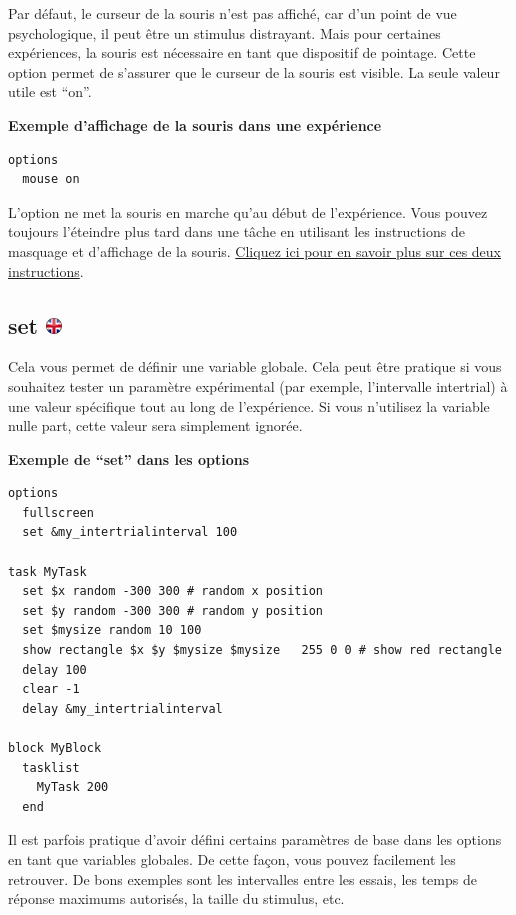 \documentclass[
]{book}
\begin{document}
Par défaut, le curseur de la souris n'est pas affiché, car d'un point de vue psychologique, il peut être un stimulus distrayant. Mais pour certaines expériences, la souris est nécessaire en tant que dispositif de pointage. Cette option permet de s'assurer que le curseur de la souris est visible. La seule valeur utile est ``on''.

\textbf{Exemple d'affichage de la souris dans une expérience}

\begin{verbatim}
options
  mouse on
\end{verbatim}

L'option ne met la souris en marche qu'au début de l'expérience. Vous pouvez toujours l'éteindre plus tard dans une tâche en utilisant les instructions de masquage et d'affichage de la souris. \protect\hyperlink{task-mouse}{Cliquez ici pour en savoir plus sur ces deux instructions}.

\hypertarget{set}{%
\subsection[set ]{\texorpdfstring{set \href{https://www.psytoolkit.org/doc3.2.0/syntax.html\#options-set}{\protect\includegraphics{img/ukflag.png}}}{set }}\label{set}}

Cela vous permet de définir une variable globale. Cela peut être pratique si vous souhaitez tester un paramètre expérimental (par exemple, l'intervalle intertrial) à une valeur spécifique tout au long de l'expérience. Si vous n'utilisez la variable nulle part, cette valeur sera simplement ignorée.

\textbf{Exemple de ``set'' dans les options}

\begin{verbatim}
options
  fullscreen
  set &my_intertrialinterval 100

task MyTask
  set $x random -300 300 # random x position
  set $y random -300 300 # random y position
  set $mysize random 10 100
  show rectangle $x $y $mysize $mysize   255 0 0 # show red rectangle
  delay 100
  clear -1
  delay &my_intertrialinterval

block MyBlock
  tasklist
    MyTask 200
  end
\end{verbatim}

Il est parfois pratique d'avoir défini certains paramètres de base dans les options en tant que variables globales. De cette façon, vous pouvez facilement les retrouver. De bons exemples sont les intervalles entre les essais, les temps de réponse maximums autorisés, la taille du stimulus, etc.
\end{document}
